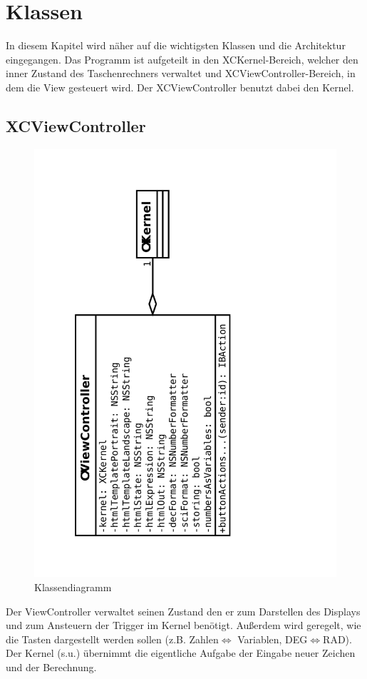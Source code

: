 \chapter{Klassen}
In diesem Kapitel wird näher auf die wichtigsten Klassen und die Architektur eingegangen.
Das Programm ist aufgeteilt in den XCKernel-Bereich, welcher den inner Zustand des Taschenrechners verwaltet
und XCViewController-Bereich, in dem die View gesteuert wird. Der XCViewController benutzt dabei den Kernel.
\section{XCViewController}
\begin{figure}[H]
	\centering
	\label{dia:sq:eval}
	\includegraphics[angle=270, width=1\textwidth]{cl_vc.pdf}
	\caption{Klassendiagramm}
\end{figure}
Der ViewController verwaltet seinen Zustand den er zum Darstellen des Displays und zum Ansteuern der Trigger im Kernel benötigt.
Außerdem wird geregelt, wie die Tasten dargestellt werden sollen (z.B. Zahlen$\iff$ Variablen, DEG$\iff$RAD). 
Der Kernel (s.u.) übernimmt die eigentliche Aufgabe der Eingabe neuer Zeichen und der Berechnung.

